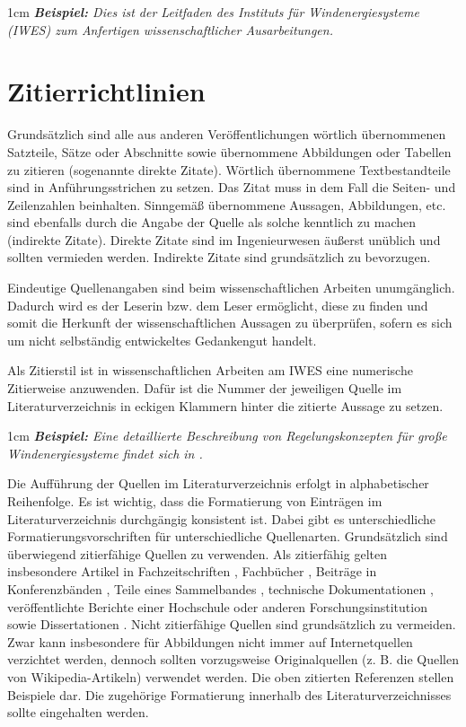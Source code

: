 \begin{addmargin}[1cm]{1cm}
	\textit{\textbf{Beispiel:} Dies ist der Leitfaden des Instituts für Windenergiesysteme (IWES) zum Anfertigen wissenschaftlicher Ausarbeitungen.}
\end{addmargin}



\section{Zitierrichtlinien}
\label{sec:Zitier}

Grundsätzlich sind alle aus anderen Veröffentlichungen wörtlich übernommenen Satzteile, Sätze oder Abschnitte sowie übernommene Abbildungen oder Tabellen zu zitieren (sogenannte direkte Zitate). Wörtlich übernommene Textbestandteile sind in Anführungsstrichen zu setzen. Das Zitat muss in dem Fall die Seiten- und Zeilenzahlen beinhalten. Sinngemäß übernommene Aussagen, Abbildungen, etc. sind ebenfalls durch die Angabe der Quelle als solche kenntlich zu machen (indirekte Zitate). Direkte Zitate sind im Ingenieurwesen äußerst unüblich und sollten vermieden werden. Indirekte Zitate sind grundsätzlich zu bevorzugen.

Eindeutige Quellenangaben sind beim wissenschaftlichen Arbeiten unumgänglich. Dadurch wird es der Leserin bzw. dem Leser ermöglicht, diese zu finden und somit die Herkunft der wissenschaftlichen Aussagen zu überprüfen, sofern es sich um nicht selbständig entwickeltes Gedankengut handelt.

Als Zitierstil ist in wissenschaftlichen Arbeiten am IWES eine numerische Zitierweise anzuwenden. Dafür ist die Nummer der jeweiligen Quelle im Literaturverzeichnis in eckigen Klammern hinter die zitierte Aussage zu setzen. 

\begin{addmargin}[1cm]{1cm}
	\textit{\textbf{Beispiel:} Eine detaillierte Beschreibung von Regelungskonzepten für große Windenergiesysteme findet sich in \cite{buch}.}
\end{addmargin}

Die Aufführung der Quellen im Literaturverzeichnis erfolgt in alphabetischer Reihenfolge. Es ist wichtig, dass die Formatierung von Einträgen im Literaturverzeichnis durchgängig konsistent ist. Dabei gibt es unterschiedliche Formatierungsvorschriften für unterschiedliche Quellenarten. Grundsätzlich sind überwiegend zitierfähige Quellen zu verwenden. Als zitierfähig gelten insbesondere Artikel in Fachzeitschriften \cite{artikel}, Fachbücher \cite{buch}, Beiträge in Konferenzbänden \cite{inp}, Teile eines Sammelbandes \cite{in}, technische Dokumentationen \cite{manual}, veröffentlichte Berichte einer Hochschule oder anderen Forschungsinstitution \cite{bericht} sowie Dissertationen \cite{thesis}. Nicht zitierfähige Quellen sind grundsätzlich zu vermeiden. Zwar kann insbesondere für Abbildungen nicht immer auf Internetquellen \cite{internet} verzichtet werden, dennoch sollten vorzugsweise Originalquellen (z. B. die Quellen von Wikipedia-Artikeln) verwendet werden. Die oben zitierten Referenzen stellen Beispiele dar. Die zugehörige Formatierung innerhalb des Literaturverzeichnisses sollte eingehalten werden.

